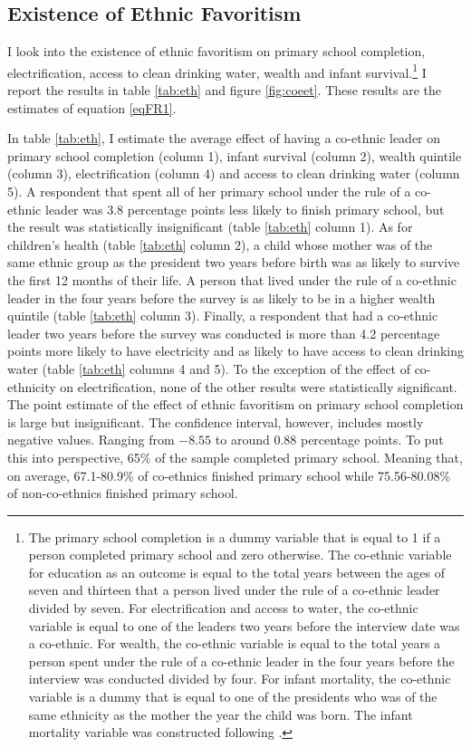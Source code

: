 \documentclass{wptemp}
\begin{document}
\subsection{Existence of Ethnic Favoritism} \label{subsec1}
I look into the existence of ethnic favoritism on primary school completion, electrification, access to clean drinking water, wealth and infant survival.\footnote{The primary school completion is a dummy variable that is equal to 1 if a person completed primary school and zero otherwise. The co-ethnic variable for education as an outcome is equal to the total years between the ages of seven and thirteen that a person lived under the rule of a co-ethnic leader divided by seven. For electrification and access to water, the co-ethnic variable is equal to one of the leaders two years before the interview date was a co-ethnic. For wealth, the co-ethnic variable is equal to the total years a person spent under the rule of a co-ethnic leader in the four years before the interview was conducted divided by four. For infant mortality, the co-ethnic variable is a dummy that is equal to one of the presidents who was of the same ethnicity as the mother the year the child was born. The infant mortality variable was constructed following \citet{kudamatsu2009ethnic, kudamatsu2012has}.} I report the results in table \ref{tab:eth} and figure \ref{fig:coeet}. These results are the estimates of equation \ref{eqFR1}. 



In table \ref{tab:eth},  I estimate the average effect of having a co-ethnic leader on primary school completion (column 1), infant survival (column 2), wealth quintile (column 3), electrification (column 4) and access to clean drinking water (column 5). A respondent that spent all of her primary school under the rule of a co-ethnic leader was $3.8$ percentage points less likely to finish primary school, but the result was statistically insignificant (table \ref{tab:eth} column 1). As for children's health (table \ref{tab:eth} column 2), a child whose mother was of the same ethnic group as the president two years before birth was as likely to survive the first 12 months of their life. A person that lived under the rule of a co-ethnic leader in the four years before the survey is as likely to be in a higher wealth quintile (table \ref{tab:eth} column 3). Finally, a respondent that had a co-ethnic leader two years before the survey was conducted is more than 4.2 percentage points more likely to have electricity and as likely to have access to clean drinking water (table \ref{tab:eth} columns 4 and 5). To the exception of the effect of co-ethnicity on electrification, none of the other results were statistically significant. The point estimate of the effect of ethnic favoritism on primary school completion is large but insignificant. The confidence interval, however, includes mostly negative values. Ranging from $-8.55$  to around $0.88$ percentage points. To put this into perspective, 65\% of the sample completed primary school. Meaning that, on average, 67.1-80.9\% of co-ethnics finished primary school while 75.56-80.08\% of non-co-ethnics finished primary school.
\end{document}
